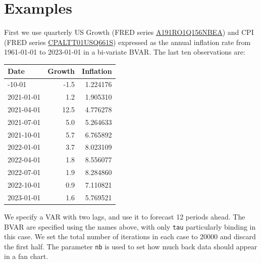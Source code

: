 \documentclass[
  letterpaper,
]{book}
\begin{document}
\hypertarget{examples}{%
\section{Examples}\label{examples}}

First we use quarterly US Growth (FRED series
\href{https://fred.stlouisfed.org/series/A191RO1Q156NBEA}{A191RO1Q156NBEA})
and CPI (FRED series
\href{https://fred.stlouisfed.org/series/CPALTT01USQ661S}{CPALTT01USQ661S})
expressed as the annual inflation rate from 1961-01-01 to 2023-01-01 in
a bi-variate BVAR. The last ten observations are:

\begin{longtable}[]{@{}lrr@{}}
\toprule\noalign{}
Date & Growth & Inflation \\
\midrule\noalign{}
\endhead
\bottomrule\noalign{}
\endlastfoot
2020-10-01 & -1.5 & 1.224176 \\
2021-01-01 & 1.2 & 1.905310 \\
2021-04-01 & 12.5 & 4.776278 \\
2021-07-01 & 5.0 & 5.264633 \\
2021-10-01 & 5.7 & 6.765892 \\
2022-01-01 & 3.7 & 8.023109 \\
2022-04-01 & 1.8 & 8.556077 \\
2022-07-01 & 1.9 & 8.284860 \\
2022-10-01 & 0.9 & 7.110821 \\
2023-01-01 & 1.6 & 5.769521 \\
\end{longtable}

We specify a VAR with two lags, and use it to forecast 12 periods ahead.
The BVAR are specified using the names above, with only \texttt{tau}
particularly binding in this case. We set the total number of iterations
in each case to 20000 and discard the first half. The parameter
\texttt{nb} is used to set how much back data should appear in a fan
chart.
\end{document}
